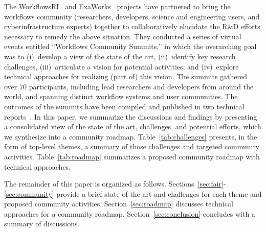 The WorkflowsRI~\cite{workflowsri} and ExaWorks~\cite{al2021exaworks} projects have partnered to bring the workflows community (researchers, developers, science and engineering users, and cyberinfrastructure experts) together to collaboratively elucidate the R\&D efforts necessary to remedy the above situation. They conducted a series of virtual events entitled ``Workflows Community Summits,'' in which the overarching goal was to (i)~develop a view of the state of the art, (ii)~identify key research challenges, (iii)~articulate a vision for potential activities, and (iv)~explore technical approaches for realizing (part of) this vision. The summits gathered over 70 participants, including lead researchers and developers from around the world, and spanning distinct workflow systems and user communities. 
The outcomes of the summits have been compiled and published in two technical reports~\cite{ferreiradasilva2021wcs, wcs2021technical}. In this paper, we summarize the discussions and findings by presenting a consolidated view of the state of the art, challenges, and  potential efforts, which we synthesize into a community roadmap. Table~\ref{tab:challenges} presents, in the form of top-level themes, a summary of those challenges and targeted community activities. Table~\ref{tab:roadmap} summarizes a proposed community roadmap with technical approaches. 

The remainder of this paper is organized as follows. Sections~\ref{sec:fair}-\ref{sec:community} provide a brief state of the art and challenges for each theme and proposed community activities. Section~\ref{sec:roadmap} discusses technical approaches for a community roadmap. Section~\ref{sec:conclusion} concludes with a summary of  discussions.


